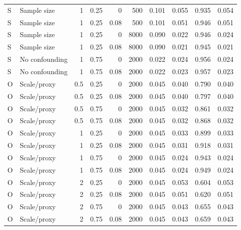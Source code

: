 \begin{longtable}{lp{2.5cm}rrrrrrrr}
S & Sample size & 1 & 0.25 & 0 & 500 & 0.101 & 0.055 & 0.935 & 0.054 \\
S & Sample size & 1 & 0.25 & 0.08 & 500 & 0.101 & 0.051 & 0.946 & 0.051 \\
S & Sample size & 1 & 0.25 & 0 & 8000 & 0.090 & 0.022 & 0.946 & 0.024 \\
S & Sample size & 1 & 0.25 & 0.08 & 8000 & 0.090 & 0.021 & 0.945 & 0.021 \\
S & No confounding & 1 & 0.75 & 0 & 2000 & 0.022 & 0.024 & 0.956 & 0.024 \\
S & No confounding & 1 & 0.75 & 0.08 & 2000 & 0.022 & 0.023 & 0.957 & 0.023 \\
O & Scale/proxy & 0.5 & 0.25 & 0 & 2000 & 0.045 & 0.040 & 0.790 & 0.040 \\
O & Scale/proxy & 0.5 & 0.25 & 0.08 & 2000 & 0.045 & 0.040 & 0.797 & 0.040 \\
O & Scale/proxy & 0.5 & 0.75 & 0 & 2000 & 0.045 & 0.032 & 0.861 & 0.032 \\
O & Scale/proxy & 0.5 & 0.75 & 0.08 & 2000 & 0.045 & 0.032 & 0.868 & 0.032 \\
O & Scale/proxy & 1 & 0.25 & 0 & 2000 & 0.045 & 0.033 & 0.899 & 0.033 \\
O & Scale/proxy & 1 & 0.25 & 0.08 & 2000 & 0.045 & 0.031 & 0.918 & 0.031 \\
O & Scale/proxy & 1 & 0.75 & 0 & 2000 & 0.045 & 0.024 & 0.943 & 0.024 \\
O & Scale/proxy & 1 & 0.75 & 0.08 & 2000 & 0.045 & 0.024 & 0.949 & 0.024 \\
O & Scale/proxy & 2 & 0.25 & 0 & 2000 & 0.045 & 0.053 & 0.604 & 0.053 \\
O & Scale/proxy & 2 & 0.25 & 0.08 & 2000 & 0.045 & 0.051 & 0.620 & 0.051 \\
O & Scale/proxy & 2 & 0.75 & 0 & 2000 & 0.045 & 0.043 & 0.655 & 0.043 \\
O & Scale/proxy & 2 & 0.75 & 0.08 & 2000 & 0.045 & 0.043 & 0.659 & 0.043 \\
\end{longtable}
